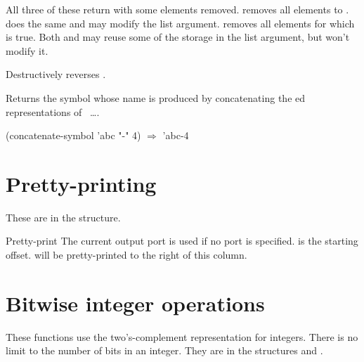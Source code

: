 \begin{protos}
\end{protos}
All three of these return  with some elements removed.
 removes all elements  to .  
does the same and may modify the list argument.   removes
all elements for which  is true.  Both  and
 may reuse some of the storage in the list argument, but
won't modify it.

\begin{protos}
\end{protos}
Destructively reverses .

\begin{protos}
\end{protos}
Returns the symbol whose name is produced by concatenating the
ed
representations of ~\ldots.

\begin{example}
(concatenate-symbol 'abc "-" 4) \(\Longrightarrow\) 'abc-4
\end{example}

\section{Pretty-printing}

These are in the  structure.

\begin{protos}
\end{protos}
Pretty-print  The current output port is used if no port is
specified.   is the starting offset.   will be
pretty-printed to the right of this column.

\section{Bitwise integer operations}

These functions use the two's-complement representation for integers.
There is no limit to the number of bits in an integer.
They are in the structures  and .

